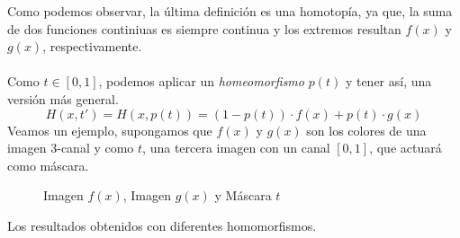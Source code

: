 Como podemos observar,  la última definición es una homotopía, ya que, la suma de dos funciones continiuas es siempre continua y los extremos resultan \(f(x)\) y \(g(x)\), respectivamente.\\\\
Como \(t\in[0,1]\), podemos aplicar un \textit{homeomorfismo} \(p(t)\) y tener así, una versión más general.
    \[H(x, t')=H(x, p(t))=(1-p(t))\cdot f(x) + p(t)\cdot g(x)\]
Veamos un ejemplo, supongamos que \(f(x)\) y \(g(x)\) son los colores de una imagen 3-canal y como \(t\), una tercera imagen con un canal \([0,1]\), que actuará como máscara.
\begin{figure}[H]
  \centering
  \captionsetup{justification=centering}%
  \hfill
  \hfill
  \caption{Imagen \(f(x)\), Imagen \(g(x)\) y Máscara \(t\)}
  \label{fig:textures}
\end{figure}
Los resultados obtenidos con diferentes homomorfismos.
